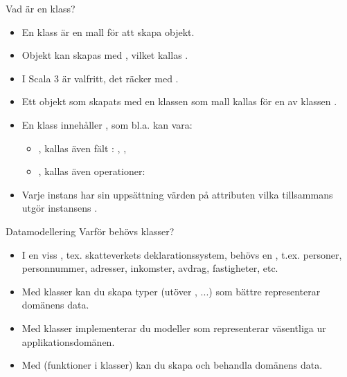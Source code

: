 \begin{Slide}{Vad är en klass?}
\begin{itemize}
\item En klass är en mall  för att skapa objekt.
\item Objekt kan skapas med , vilket kallas . 
\item I Scala 3 är  valfritt, det räcker med . 
\item Ett objekt som skapats med en klassen  som mall kallas för en  av klassen .
\item En klass innehåller  , som bl.a. kan vara:
  \begin{itemize}
  \item {}, kallas även fält : , , 
  \item {}, kallas även operationer: 
  \end{itemize}
\item Varje instans har sin uppsättning värden på attributen
vilka tillsammans utgör instansens .
\end{itemize}

\end{Slide}
  

\begin{Slide}{Datamodellering}
Varför behövs klasser? 
\begin{itemize}
\item I en viss  , tex. skatteverkets deklarationssystem, behövs en , t.ex. personer, personnummer, adresser, inkomster, avdrag, fastigheter, etc.
\item Med klasser kan du skapa  typer (utöver ,  ...) som bättre representerar domänens data.
\item Med klasser implementerar du modeller som representerar väsentliga  ur applikationsdomänen. 
\item Med  (funktioner i klasser) kan du skapa och behandla domänens data.
\end{itemize}
\end{Slide}

